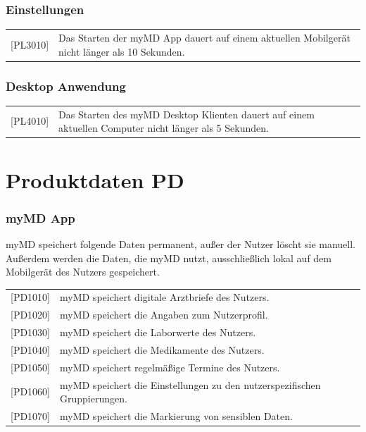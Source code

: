 \documentclass[a4paper]{scrreprt}
\begin{document}
\subsection{Einstellungen}
\begin{tabular}{lll}
[PL3010]&  \multicolumn{2}{p{12cm}}{Das Starten der myMD App dauert auf einem aktuellen Mobilgerät nicht länger als 10 Sekunden.}\\


\end{tabular}

\subsection{Desktop Anwendung}
\begin{tabular}{lll}
[PL4010]&  \multicolumn{2}{p{12cm}}{Das Starten des myMD Desktop Klienten dauert auf einem aktuellen Computer nicht länger als 5 Sekunden.}\\

\end{tabular}



\chapter{Produktdaten PD}
\subsection{myMD \gls{App}}
myMD speichert folgende Daten permanent, außer der Nutzer löscht sie manuell. Außerdem werden die Daten, die myMD nutzt, ausschließlich lokal auf dem Mobilgerät des Nutzers gespeichert.
\newline
\newline
\begin{tabular}{lll}
[PD1010]&  \multicolumn{2}{p{12cm}}{myMD speichert digitale Arztbriefe des Nutzers.}\\
{[PD1020]} &  \multicolumn{2}{p{12cm}}{myMD speichert die Angaben zum Nutzerprofil.}\\
{[PD1030]} &  \multicolumn{2}{p{12cm}}{myMD speichert die Laborwerte des Nutzers.}\\
{[PD1040]} &  \multicolumn{2}{p{12cm}}{myMD speichert die Medikamente des Nutzers.}  \\
{[PD1050]} &  \multicolumn{2}{p{12cm}}{myMD speichert regelmäßige Termine des Nutzers.}  \\
{[PD1060]} &  \multicolumn{2}{p{12cm}}{myMD speichert die Einstellungen zu den nutzerspezifischen Gruppierungen.}  \\
{[PD1070]} &  \multicolumn{2}{p{12cm}}{myMD speichert die Markierung von sensiblen Daten.}  \\

\end{tabular}
\end{document}
